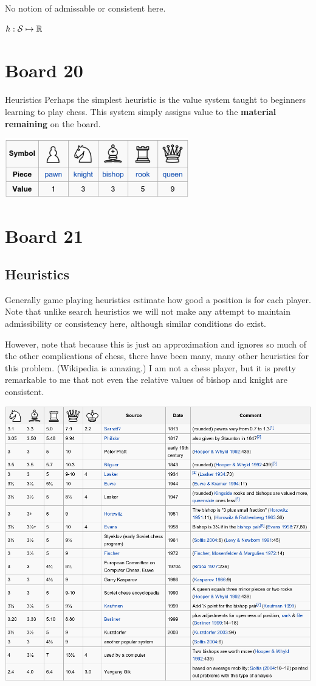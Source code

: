 \documentclass[11pt]{article}
\begin{document}
No notion of admissable or consistent here. 

$h: \mathcal{S} \mapsto \mathbb{R}$

\section{Board 20}

Heuristics
Perhaps the simplest heuristic is the value system taught to beginners learning to play chess. This system simply assigns value to the \textbf{material remaining} on the board. 
\air

\centerline{\includegraphics[width=8cm]{../pics/chessvalues1}}
\air

\section{Board 21}

\subsection{Heuristics}

Generally game playing heuristics estimate how good a position is for each player. Note that unlike search heuristics we will not make any attempt to maintain admissibility or consistency here, although similar conditions do exist.


However, note that because this is just an approximation and ignores so much of the other complications of chess, there have been many, many other heuristics for this problem. (Wikipedia is amazing.) I am not a chess player, but it is pretty remarkable to me that not even the relative values of bishop and knight are consistent.

\centerline{ \includegraphics[width=16cm]{../pics/chess_value}}
\vspace{1cm}
\end{document}
